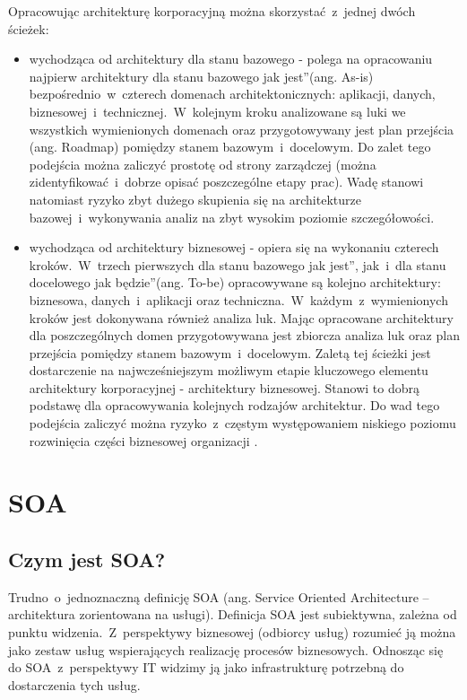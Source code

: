 Opracowując architekturę korporacyjną można skorzystać~z~jednej dwóch ścieżek:
\begin{itemize}
\item{wychodząca od architektury dla stanu bazowego - polega na opracowaniu najpierw architektury dla stanu bazowego \quotedblbase jak jest\textquotedblright (ang. As-is) bezpośrednio~w~czterech domenach architektonicznych: aplikacji, danych, biznesowej~i~technicznej.~W~kolejnym kroku analizowane są luki we wszystkich wymienionych domenach oraz przygotowywany jest plan przejścia (ang. Roadmap) pomiędzy stanem bazowym~i~docelowym. Do zalet tego podejścia można zaliczyć prostotę od strony zarządczej (można zidentyfikować~i~dobrze opisać poszczególne etapy prac). Wadę stanowi natomiast ryzyko zbyt dużego skupienia się na architekturze bazowej~i~wykonywania analiz na zbyt wysokim poziomie szczegółowości.}
\item{wychodząca od architektury biznesowej - opiera się na wykonaniu czterech kroków.~W~trzech pierwszych dla stanu bazowego \quotedblbase jak jest\textquotedblright, jak~i~dla stanu docelowego \quotedblbase jak będzie\textquotedblright (ang. To-be) opracowywane są kolejno architektury: biznesowa, danych~i~aplikacji oraz techniczna.~W~każdym~z~wymienionych kroków jest dokonywana również analiza luk. Mając opracowane architektury dla poszczególnych domen przygotowywana jest zbiorcza analiza luk oraz plan przejścia pomiędzy stanem bazowym~i~docelowym. Zaletą tej ścieżki jest dostarczenie na najwcześniejszym możliwym etapie kluczowego elementu architektury korporacyjnej - architektury biznesowej. Stanowi to dobrą podstawę dla opracowywania kolejnych rodzajów architektur. Do wad tego podejścia zaliczyć można ryzyko~z~częstym występowaniem niskiego poziomu rozwinięcia części biznesowej organizacji \cite{ArchKorpSob}.}
\end{itemize}

\section{SOA}
\subsection{Czym jest SOA?}
Trudno~o~jednoznaczną definicję SOA (ang. Service Oriented Architecture – architektura zorientowana na usługi). Definicja SOA jest subiektywna, zależna od punktu widzenia.~Z~perspektywy biznesowej (odbiorcy usług) rozumieć ją można jako zestaw usług wspierających realizację procesów biznesowych. Odnosząc się do SOA~z~perspektywy IT widzimy ją jako infrastrukturę potrzebną do dostarczenia tych usług.
	
